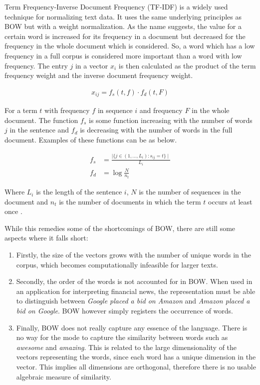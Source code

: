 Term Frequency-Inverse Document Frequency (TF-IDF) is a widely used technique for normalizing text data. It uses the same underlying principles as BOW but with a weight normalization. As the name suggests, the value for a certain word is increased for its frequency in a document but decreased for the frequency in the whole document which is considered. So, a word which has a low frequency in a full corpus is considered more important than a word with low frequency. The entry $j$ in a vector $x_i$ is then calculated as the product of the term frequency weight and the inverse document frequency weight. 

\begin{align*}
    x_{ij} = f_s(t,f) \cdot f_d(t,F)
\end{align*}

For a term $t$ with frequency $f$ in sequence $i$ and frequency $F$ in the whole document. The function $f_s$ is some function increasing with the number of words $j$ in the sentence and $f_d$ is decreasing with the number of words in the full document. Examples of these functions can be as below. 

\begin{align*}
    f_s &= \frac{\mid \{ j \in (1, \hdots , L_i) : s_{ij} = t  \} \mid}{L_i} \\
    f_d &= \log{\frac{N}{n_t}}
\end{align*}

Where $L_i$ is the length of the sentence $i$, $N$ is the number of sequences in the document and $n_t$ is the number of documents in which the term $t$ occurs at least once \citep{manning2008introduction}. 

While this remedies some of the shortcomings of BOW, there are still some aspects where it falls short: 
\begin{enumerate}
    \item Firstly, the size of the vectors grows with the number of unique words in the corpus, which becomes computationally infeasible for larger texts. 
    \item Secondly, the order of the words is not accounted for in BOW. When used in an application for interpreting financial news, the representation must be able to distinguish between \textit{Google placed a bid on Amazon} and \textit{Amazon placed a bid on Google}. BOW however simply registers the occurrence of words. 
    \item Finally, BOW does not really capture any essence of the language. There is no way for the mode to capture the similarity between words such as \textit{awesome} and \textit{amazing}. This is related to the large dimensionality of the vectors representing the words, since each word has a unique dimension in the vector. This implies all dimensions are orthogonal, therefore there is no usable algebraic measure of similarity. 
\end{enumerate}

